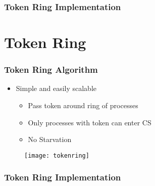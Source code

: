 \documentclass[t, pdftex]{beamer}
\begin{document}
\begin{frame}
	\frametitle{Token Ring Implementation}
	  \begin{multicols*}{3}
    
  \end{multicols*}
\end{frame}


\section{Token Ring}
\begin{frame}[c]
    \frametitle{Token Ring Algorithm}
    \begin{itemize}
		\item Simple and easily scalable
		 \begin{itemize}
          \item Pass token around ring of processes
          \item Only processes with token can enter CS
		  \item No Starvation
        \end{itemize}
    \end{itemize}
	
	
 \begin{figure}
	 \begin{minipage}{.5\textwidth}
      \centering
      \texttt{[image: tokenring]}
      \label{fig:Token Ring}
    \end{minipage}
\end{figure}
	
\end{frame}

\begin{frame}
	\frametitle{Token Ring Implementation}
	  \begin{multicols*}{3}
    
  \end{multicols*}
\end{frame}
\end{document}
